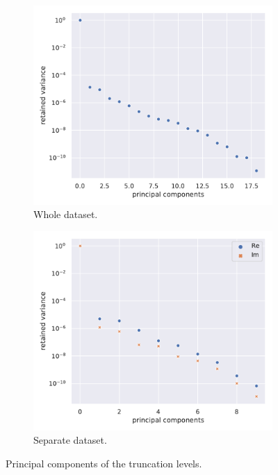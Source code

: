 \begin{figure}[htbp]
  \centering
  \begin{subfigure}{0.45\textwidth}
    \centering
    \includegraphics[width=\linewidth]{img/wzw_svd_tot}
    \caption{Whole dataset.}
  \end{subfigure}
  \begin{subfigure}{0.45\textwidth}
    \centering
    \includegraphics[width=\linewidth]{img/wzw_svd_sep}
    \caption{Separate dataset.}
  \end{subfigure}
  \caption{Principal components of the truncation levels.}
  \label{fig:wzw:svd}
\end{figure}


